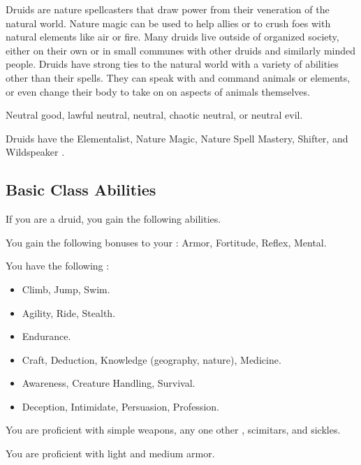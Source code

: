     Druids are nature spellcasters that draw power from their veneration of the natural world.
    Nature magic can be used to help allies or to crush foes with natural elements like air or fire.
    Many druids live outside of organized society, either on their own or in small communes with other druids and similarly minded people.
    Druids have strong ties to the natural world with a variety of abilities other than their spells.
    They can speak with and command animals or elements, or even change their body to take on on aspects of animals themselves.

     Neutral good, lawful neutral, neutral, chaotic neutral, or neutral evil.

     Druids have the Elementalist, Nature Magic, Nature Spell Mastery, Shifter, and Wildspeaker .

    \subsection{Basic Class Abilities}
        If you are a druid, you gain the following abilities.

        You gain the following bonuses to your :  Armor,  Fortitude,  Reflex,  Mental.

        You have the following :
        \begin{itemize}
            \item {} Climb, Jump, Swim.
            \item {} Agility, Ride, Stealth.
            \item {} Endurance.
            \item {} Craft, Deduction, Knowledge (geography, nature), Medicine.
            \item {} Awareness, Creature Handling, Survival.
            \item {} Deception, Intimidate, Persuasion, Profession.
        \end{itemize}

        You are proficient with simple weapons, any one other , scimitars, and sickles.

        You are proficient with light and medium armor.

